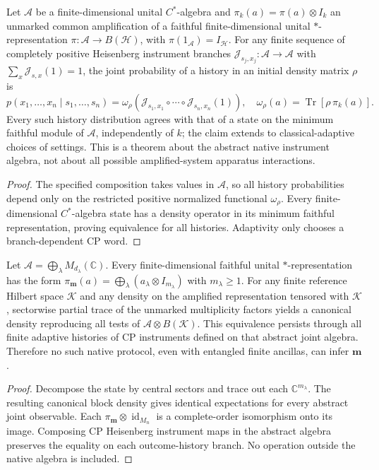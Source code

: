 \documentclass[12pt,a4paper]{article}
\begin{document}
\begin{theorem}
\label{p2b:thm:v353-multitime-amplification}
Let $\mathcal A$ be a finite-dimensional unital $C^*$-algebra and
$\pi_k(a)=\pi(a)\otimes I_k$ an unmarked common amplification of a
faithful finite-dimensional unital $*$-representation
$\pi:\mathcal A\to B(\mathcal H)$, with
$\pi(1_{\mathcal A})=I_{\mathcal H}$. For any finite sequence of completely
positive Heisenberg instrument branches
$\mathcal J_{s_j,x_j}:\mathcal A\to\mathcal A$ with
$\sum_x\mathcal J_{s,x}(1)=1$, the joint probability of a history
in an initial density matrix $\rho$ is
\[
p(x_1,\ldots,x_n\mid s_1,\ldots,s_n)
=\omega_\rho\!\left(
\mathcal J_{s_1,x_1}\circ\cdots\circ
\mathcal J_{s_n,x_n}(1)\right),\quad
\omega_\rho(a)=\operatorname{Tr}[\rho\,\pi_k(a)].
\]
Every such history distribution agrees with that of a state on the
minimum faithful module of $\mathcal A$, independently of $k$;
the claim extends to classical-adaptive choices of settings.
This is a theorem about the abstract native instrument algebra, not about
all possible amplified-system apparatus interactions.
\end{theorem}
\begin{proof}
The specified composition takes values in $\mathcal A$, so all history
probabilities depend only on the restricted positive normalized functional
$\omega_\rho$. Every finite-dimensional $C^*$-algebra state has a density
operator in its minimum faithful representation, proving equivalence for
all histories. Adaptivity only chooses a branch-dependent CP word.
\end{proof}


\begin{theorem}
\label{p2b:thm:v354-ancilla-stable-descent}
Let $\mathcal A=\bigoplus_{\lambda}M_{d_\lambda}(\mathbb C)$.
Every finite-dimensional faithful unital $*$-representation has the form
$\pi_{\mathbf m}(a)=\bigoplus_\lambda(a_\lambda\otimes I_{m_\lambda})$
with $m_\lambda\ge1$. For any finite reference Hilbert space $\mathcal K$
and any density on the amplified representation tensored with
$\mathcal K$, sectorwise partial trace of the unmarked multiplicity
factors yields a canonical density reproducing all tests of
$\mathcal A\otimes B(\mathcal K)$. This equivalence persists through
all finite adaptive histories of CP instruments defined on that
abstract joint algebra. Therefore no such native protocol, even with
entangled finite ancillas, can infer $\mathbf m$.
\end{theorem}
\begin{proof}
Decompose the state by central sectors and trace out each
$\mathbb C^{m_\lambda}$. The resulting canonical block density gives
identical expectations for every abstract joint observable.
Each $\pi_{\mathbf m}\otimes\operatorname{id}_{M_n}$ is a
complete-order isomorphism onto its image. Composing CP Heisenberg
instrument maps in the abstract algebra preserves the equality
on each outcome-history branch. No operation outside the native algebra
is included.
\end{proof}
\end{document}
